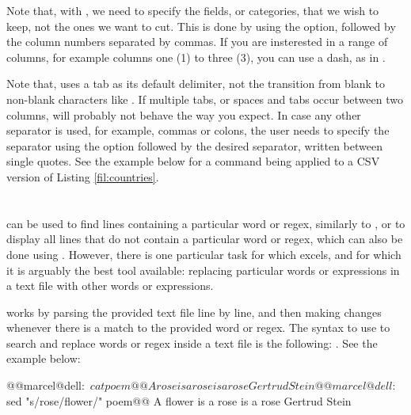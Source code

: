 Note that, with , we need to specify the fields, or categories, that we wish to keep, not the ones we want to cut. This is done by using the  option, followed by the column numbers separated by commas. If you are insterested in a range of columns, for example columns one (1) to three (3), you can use a dash, as in .

Note that,  uses a tab as its default delimiter, not the transition from blank to non-blank characters like . If multiple tabs, or spaces and tabs occur between two columns,  will probably not behave the way you expect. In case any other separator is used, for example, commas or colons, the user needs to specify the separator using the  option followed by the desired separator, written between single quotes. See the example below for a  command being applied to a \acs{CSV} version of Listing \ref{fil:countries}.


\section{}

 can be used to find lines containing a particular word or \acs{regex}, similarly to , or to display all lines that do not contain a particular word or \acs{regex}, which can also be done using . However, there is one particular task for which  excels, and for which it is arguably the best tool available: replacing particular words or expressions in a text file with other words or expressions.

 works by parsing the provided text file line by line, and then making changes whenever there is a match to the provided word or \acs{regex}. The syntax to use  to search and replace words or \acs{regex} inside a text file is the following: . See the example below:

\begin{command_line}[make]
@@marcel@dell:~$ cat poem@@
A rose is a rose is a rose
Gertrud Stein
@@marcel@dell:~$ sed "s/rose/flower/" poem@@
A flower is a rose is a rose
Gertrud Stein
\end{command_line}

